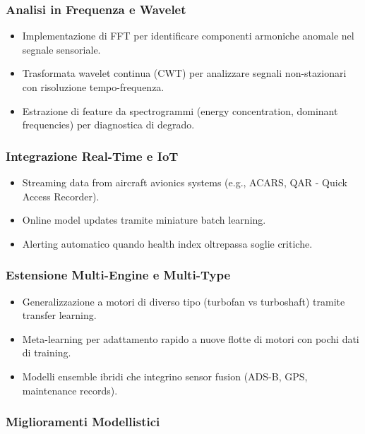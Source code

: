 \subsubsection{Analisi in Frequenza e Wavelet}

\begin{itemize}
    \item Implementazione di FFT per identificare componenti armoniche anomale nel segnale sensoriale.
    \item Trasformata wavelet continua (CWT) per analizzare segnali non-stazionari con risoluzione tempo-frequenza.
    \item Estrazione di feature da spectrogrammi (energy concentration, dominant frequencies) per diagnostica di degrado.
\end{itemize}

\subsubsection{Integrazione Real-Time e IoT}

\begin{itemize}
    \item Streaming data from aircraft avionics systems (e.g., ACARS, QAR - Quick Access Recorder).
    \item Online model updates tramite miniature batch learning.
    \item Alerting automatico quando health index oltrepassa soglie critiche.
\end{itemize}

\subsubsection{Estensione Multi-Engine e Multi-Type}

\begin{itemize}
    \item Generalizzazione a motori di diverso tipo (turbofan vs turboshaft) tramite transfer learning.
    \item Meta-learning per adattamento rapido a nuove flotte di motori con pochi dati di training.
    \item Modelli ensemble ibridi che integrino sensor fusion (ADS-B, GPS, maintenance records).
\end{itemize}

\subsubsection{Miglioramenti Modellistici}

